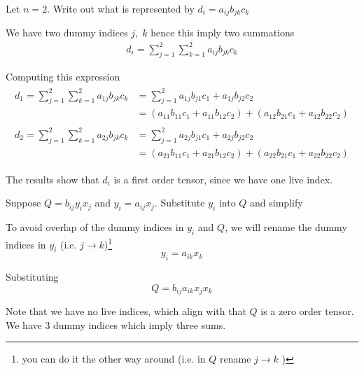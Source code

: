\documentclass[../main.tex]{subfiles}
\begin{document}
	\begin{example}
		Let $n = 2$. Write out what is represented by $d_i = a_{ij} b_{jk} c_k$
	\end{example}
	\begin{solution}
		We have two dummy indices $j, \; k$ hence this imply two summations
		\begin{align*}
			d_i = \sum_{j=1}^2 \sum_{k=1}^2 a_{ij} b_{jk} c_k
		\end{align*}
		
		Computing this expression
		\begin{align*}
			\begin{split}
				d_1 = \sum_{j=1}^2 \sum_{k=1}^2 a_{1j} b_{jk} c_k 	&= \sum_{j=1}^2 a_{1j} b_{j1} c_1 + a_{1j} b_{j2} c_2 \\
																	&= (a_{11} b_{11} c_1 + a_{11} b_{12} c_2) + (a_{12} b_{21} c_1 + a_{12} b_{22} c_2)
			\end{split} \\
			\begin{split} 
				d_2 = \sum_{j=1}^2 \sum_{k=1}^2 a_{2j} b_{jk} c_k	&= \sum_{j=1}^2 a_{2j} b_{j1} c_1 + a_{2j} b_{j2} c_2 \\
																	&= (a_{21} b_{11} c_1 + a_{21} b_{12} c_2) + (a_{22} b_{21} c_1 + a_{22} b_{22} c_2)
			\end{split}
		\end{align*}
		
		The results show that $d_i$ is a first order tensor, since we have one live index.
	\end{solution}

	
	\begin{example}
		Suppose $Q = b_{ij} y_i x_j$ and $y_i = a_{ij} x_j$. Substitute $y_i$ into $Q$ and simplify
	\end{example}
	\begin{solution}
		To avoid overlap of the dummy indices in $y_i$ and $Q$, we will rename the dummy indices in $y_i$ (i.e. $j \rightarrow k$)\footnote{you can do it the other way around (i.e. in $Q$ rename $j \rightarrow k$ )}
		\begin{equation*}
			y_i = a_{ik} x_k
		\end{equation*}
		
		Substituting
		\begin{equation*}
			Q = b_{ij} a_{ik} x_j x_k
		\end{equation*}
		
		Note that we have no live indices, which align with that $Q$ is a zero order tensor. We have 3 dummy indices which imply three sums.
	\end{solution}

	
\end{document}
